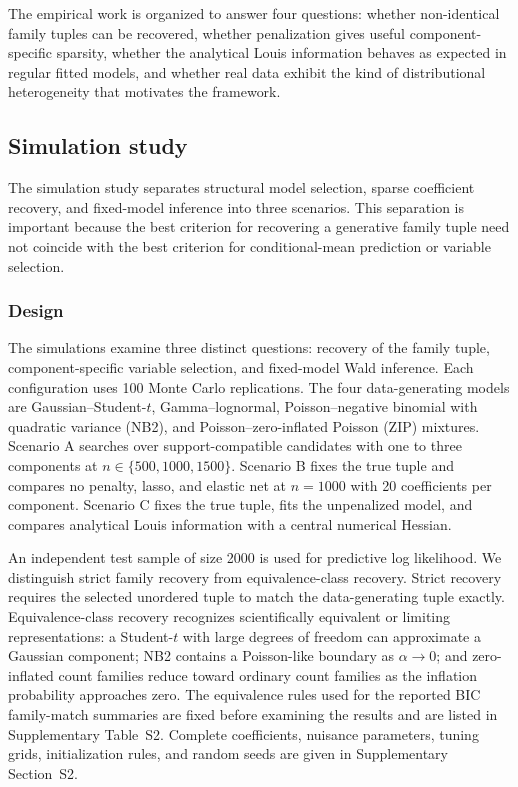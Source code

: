 \documentclass[11pt]{article}
\begin{document}
The empirical work is organized to answer four questions: whether
non-identical family tuples can be recovered, whether penalization gives useful
component-specific sparsity, whether the analytical Louis information behaves
as expected in regular fitted models, and whether real data exhibit the kind of
distributional heterogeneity that motivates the framework.

\subsection{Simulation study}
\label{sec:simulation}

The simulation study separates structural model selection, sparse coefficient
recovery, and fixed-model inference into three scenarios.  This separation is
important because the best criterion for recovering a generative family tuple
need not coincide with the best criterion for conditional-mean prediction or
variable selection.

\subsubsection{Design}

The simulations examine three distinct questions: recovery of the family tuple,
component-specific variable selection, and fixed-model Wald inference.  Each
configuration uses 100 Monte Carlo replications.  The four data-generating
models are Gaussian--Student-$t$, Gamma--lognormal, Poisson--negative binomial
with quadratic variance (NB2), and Poisson--zero-inflated Poisson (ZIP)
mixtures.  Scenario A searches over
support-compatible candidates with one to three components at
\(n\in\{500,1000,1500\}\).  Scenario B fixes the true tuple and compares no
penalty, lasso, and elastic net at \(n=1000\) with 20 coefficients per
component.  Scenario C fixes the true tuple, fits the unpenalized model, and
compares analytical Louis information with a central numerical Hessian.

An independent test sample of size 2000 is used for predictive log likelihood.
We distinguish strict family recovery from equivalence-class recovery.  Strict
recovery requires the selected unordered tuple to match the data-generating
tuple exactly.  Equivalence-class recovery recognizes scientifically equivalent
or limiting representations: a Student-\(t\) with large degrees of freedom can
approximate a Gaussian component; NB2 contains a Poisson-like boundary as
\(\alpha\to0\); and zero-inflated count families reduce toward ordinary count
families as the inflation probability approaches zero.  The equivalence rules
used for the reported BIC family-match summaries are fixed before examining
the results and are listed in Supplementary Table~S2.  Complete coefficients,
nuisance parameters, tuning grids, initialization rules, and random seeds are
given in Supplementary Section~S2.
\end{document}
